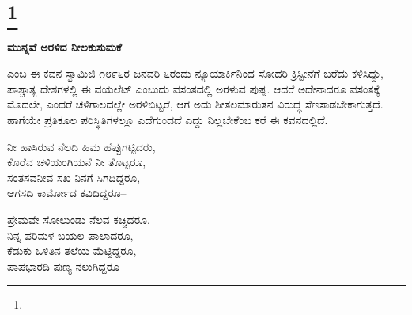 \selecteng

\chapter[TO AN EARLY VIOLET]{\protect\footnote{}}

\begin{myquote}
\end{myquote}

\selectkan

\begin{center}
\textbf{ಮುನ್ನವೆ ಅರಳಿದ ನೀಲಕುಸುಮಕೆ}
\end{center}

 ಎಂಬ ಈ ಕವನ ಸ್ವಾಮಿಜಿ ೧೮೯೬ರ ಜನವರಿ ೬ರಂದು ನ್ಯೂಯಾರ್ಕಿನಿಂದ ಸೋದರಿ ಕ್ರಿಸ್ಟೀನೆಗೆ ಬರೆದು ಕಳಿಸಿದ್ದು, ಪಾಶ್ಚಾತ್ಯ ದೇಶಗಳಲ್ಲಿ ಈ ವಯಲೆಟ್ ಎಂಬುದು ವಸಂತದಲ್ಲಿ ಅರಳುವ ಪುಷ್ಪ. ಆದರೆ ಅದೇನಾದರೂ ವಸಂತಕ್ಕೆ ಮೊದಲೇ, ಎಂದರೆ ಚಳಿಗಾಲದಲ್ಲೇ ಅರಳಿಬಿಟ್ಟರೆ, ಆಗ ಅದು ಶೀತಲಮಾರುತನ ವಿರುದ್ಧ ಸೆಣಸಾಡಬೇಕಾಗುತ್ತದೆ. ಹಾಗೆಯೇ ಪ್ರತಿಕೂಲ ಪರಿಸ್ಥಿತಿಗಳಲ್ಲೂ ಎದೆಗುಂದದೆ ಎದ್ದು ನಿಲ್ಲಬೇಕೆಂಬ ಕರೆ ಈ ಕವನದಲ್ಲಿದೆ.

\begin{myquote}
ನೀ ಹಾಸಿರುವ ನೆಲದಿ ಹಿಮ ಹೆಪ್ಪುಗಟ್ಟಿದರು,\\ಕೊರೆವ ಚಳಿಯಂಗಿಯನೆ ನೀ ತೊಟ್ಟರೂ,\\ಸಂತಸವನೀವ ಸಖ ನಿನಗೆ ಸಿಗದಿದ್ದರೂ,\\ಆಗಸದಿ ಕಾರ್ಮೋಡ ಕವಿದಿದ್ದರೂ–
\end{myquote}

\begin{myquote}
ಪ್ರೇಮವೇ ಸೋಲುಂಡು ನೆಲವ ಕಚ್ಚಿದರೂ,\\ನಿನ್ನ ಪರಿಮಳ ಬಯಲ ಪಾಲಾದರೂ,\\ಕೆಡುಕು ಒಳಿತಿನ ತಲೆಯ ಮೆಟ್ಟಿದ್ದರೂ,\\ಪಾಪಭಾರದಿ ಪುಣ್ಯ ನಲುಗಿದ್ದರೂ–
\end{myquote}

